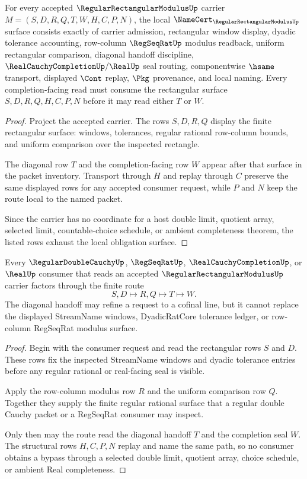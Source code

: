 \begin{theorem}
\label{thm:regular-rectangular-modulus-obligation-surface}
For every accepted $\RegularRectangularModulusUp$ carrier $M=(S,D,R,Q,T,W,H,C,P,N)$, the local $\NameCert_{\RegularRectangularModulusUp}$ surface consists exactly of carrier admission, rectangular window display, dyadic tolerance accounting, row-column $\RegSeqRatUp$ modulus readback, uniform rectangular comparison, diagonal handoff discipline, $\RealCauchyCompletionUp/\RealUp$ seal routing, componentwise $\hsame$ transport, displayed $\Cont$ replay, $\Pkg$ provenance, and local naming. Every completion-facing read must consume the rectangular surface $S,D,R,Q,H,C,P,N$ before it may read either $T$ or $W$.
\end{theorem}
\begin{proof}
Project the accepted carrier. The rows $S,D,R,Q$ display the finite rectangular surface: windows, tolerances, regular rational row-column bounds, and uniform comparison over the inspected rectangle.

The diagonal row $T$ and the completion-facing row $W$ appear after that surface in the packet inventory. Transport through $H$ and replay through $C$ preserve the same displayed rows for any accepted consumer request, while $P$ and $N$ keep the route local to the named packet.

Since the carrier has no coordinate for a host double limit, quotient array, selected limit, countable-choice schedule, or ambient completeness theorem, the listed rows exhaust the local obligation surface.
\end{proof}

\begin{theorem}
\label{thm:regular-rectangular-modulus-handoff-factorization}
Every $\RegularDoubleCauchyUp$, $\RegSeqRatUp$, $\RealCauchyCompletionUp$, or $\RealUp$ consumer that reads an accepted $\RegularRectangularModulusUp$ carrier factors through the finite route
$$
S,D \longmapsto R,Q \longmapsto T \longmapsto W .
$$
The diagonal handoff may refine a request to a cofinal line, but it cannot replace the displayed StreamName windows, DyadicRatCore tolerance ledger, or row-column RegSeqRat modulus surface.
\end{theorem}
\begin{proof}
Begin with the consumer request and read the rectangular rows $S$ and $D$. These rows fix the inspected StreamName windows and dyadic tolerance entries before any regular rational or real-facing seal is visible.

Apply the row-column modulus row $R$ and the uniform comparison row $Q$. Together they supply the finite regular rational surface that a regular double Cauchy packet or a RegSeqRat consumer may inspect.

Only then may the route read the diagonal handoff $T$ and the completion seal $W$. The structural rows $H,C,P,N$ replay and name the same path, so no consumer obtains a bypass through a selected double limit, quotient array, choice schedule, or ambient Real completeness.
\end{proof}

